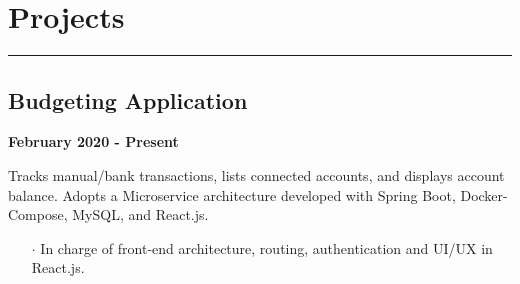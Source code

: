 \documentclass[10pt]{article}
\begin{document}
\section*{Projects}
\vspace{-.6cm}
\par\noindent\textcolor{black}{\rule{\textwidth}{.5pt}} 
\begin{paracol}{2}
    \begin{leftcolumn} \vspace{-.36cm}
        \sloppy
        \subsection*{Budgeting Application}
        \textbf{February 2020 - Present}
    \end{leftcolumn}
    
    \begin{rightcolumn}
        \begin{flushleft} \vspace{-1.2mm}
            Tracks manual/bank transactions, lists connected accounts, and displays account balance. Adopts a Microservice architecture developed with Spring Boot, Docker-Compose, MySQL, and React.js.
        \end{flushleft}
        \vspace{-.6cm}
        \begin{itemize}[leftmargin=.28cm, itemsep=1pt]
            \item[$\cdot$] In charge of front-end architecture, routing, authentication and UI/UX in React.js.
        \end{itemize}
    \end{rightcolumn}
\end{paracol}

\vspace{-.2cm}
\end{document}
